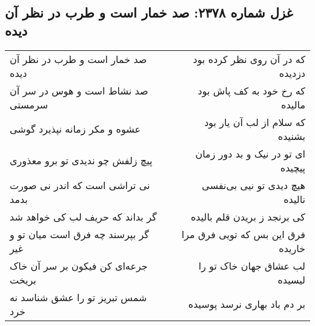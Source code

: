 \begin{center}
\section*{غزل شماره ۲۳۷۸: صد خمار است و طرب در نظر آن دیده}
\label{sec:2378}
\begin{longtable}{l p{0.5cm} r}
صد خمار است و طرب در نظر آن دیده
&&
که در آن روی نظر کرده بود دزدیده
\\
صد نشاط است و هوس در سر آن سرمستی
&&
که رخ خود به کف پاش بود مالیده
\\
عشوه و مکر زمانه نپذیرد گوشی
&&
که سلام از لب آن یار بود بشنیده
\\
پیچ زلفش چو ندیدی تو برو معذوری
&&
ای تو در نیک و بد دور زمان پیچیده
\\
نی تراشی است که اندر نی صورت بدمد
&&
هیچ دیدی تو نیی بی‌نفسی نالیده
\\
گر بداند که حریف لب کی خواهد شد
&&
کی برنجد ز بریدن قلم بالیده
\\
گر بپرسند چه فرق است میان تو و غیر
&&
فرق این بس که تویی فرق مرا خاریده
\\
جرعه‌ای کن فیکون بر سر آن خاک بریخت
&&
لب عشاق جهان خاک تو را لیسیده
\\
شمس تبریز تو را عشق شناسد نه خرد
&&
بر دم باد بهاری نرسد پوسیده
\\
\end{longtable}
\end{center}
